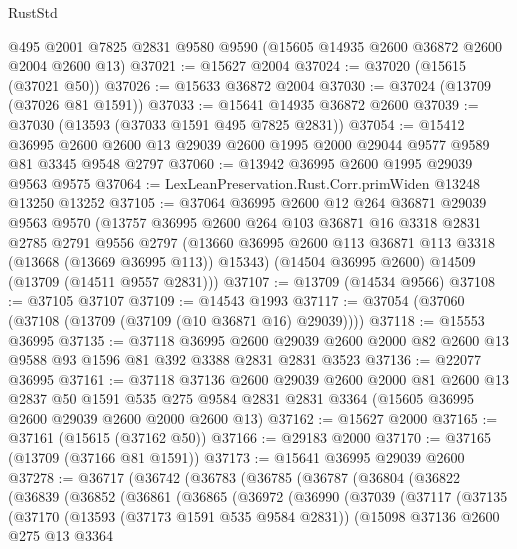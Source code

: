 \begin{lexlean}{RustStd}
\begin{coremodule}
    @495
    @2001
    @7825
    @2831
    @9580
    @9590
    (@15605 @14935 @2600 @36872 @2600 @2004 @2600 @13)
@37021 := @15627 @2004
@37024 := @37020 (@15615 (@37021 @50))
@37026 := @15633 @36872 @2004
@37030 := @37024 (@13709 (@37026 @81 @1591))
@37033 := @15641 @14935 @36872 @2600
@37039 := @37030 (@13593 (@37033 @1591 @495 @7825 @2831))
@37054 := @15412
    @36995
    @2600
    @2600
    @13
    @29039
    @2600
    @1995
    @2000
    @29044
    @9577
    @9589
    @81
    @3345
    @9548
    @2797
@37060 := @13942 @36995 @2600 @1995 @29039 @9563 @9575
@37064 := LexLeanPreservation.Rust.Corr.primWiden @13248 @13250 @13252
@37105 := @37064
    @36995
    @2600
    @12
    @264
    @36871
    @29039
    @9563
    @9570
    (@13757
      @36995
      @2600
      @264
      @103
      @36871
      @16
      @3318
      @2831
      @2785
      @2791
      @9556
      @2797
      (@13660 @36995 @2600 @113 @36871 @113 @3318 (@13668 (@13669 @36995 @113)) @15343)
      (@14504 @36995 @2600)
      @14509
      (@13709 (@14511 @9557 @2831)))
@37107 := @13709 (@14534 @9566)
@37108 := @37105 @37107
@37109 := @14543 @1993
@37117 := @37054 (@37060 (@37108 (@13709 (@37109 (@10 @36871 @16) @29039))))
@37118 := @15553 @36995
@37135 := @37118
    @36995
    @2600
    @29039
    @2600
    @2000
    @82
    @2600
    @13
    @9588
    @93
    @1596
    @81
    @392
    @3388
    @2831
    @2831
    @3523
@37136 := @22077 @36995
@37161 := @37118
    @37136
    @2600
    @29039
    @2600
    @2000
    @81
    @2600
    @13
    @2837
    @50
    @1591
    @535
    @275
    @9584
    @2831
    @2831
    @3364
    (@15605 @36995 @2600 @29039 @2600 @2000 @2600 @13)
@37162 := @15627 @2000
@37165 := @37161 (@15615 (@37162 @50))
@37166 := @29183 @2000
@37170 := @37165 (@13709 (@37166 @81 @1591))
@37173 := @15641 @36995 @29039 @2600
@37278 := @36717
    (@36742
      (@36783
        (@36785
          (@36787
            (@36804
              (@36822
                (@36839
                  (@36852
                    (@36861
                      (@36865
                        (@36972
                          (@36990
                            (@37039
                              (@37117
                                (@37135
                                  (@37170
                                    (@13593 (@37173 @1591 @535 @9584 @2831))
                                    (@15098
                                      @37136
                                      @2600
                                      @275
                                      @13
                                      @3364

\end{coremodule}
\end{lexlean}
